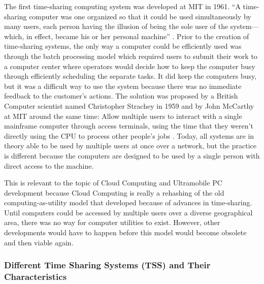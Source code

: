 \documentclass[12pt,oneside,letterpaper]{article}
\begin{document}
The first time-sharing computing system was developed at MIT in 1961.  ``A
time-sharing computer was one organized so that it could be used simultaneously
by many users, each person having the illusion of being the sole user of the
system---which, in effect, became his or her personal machine''
\citep{kelly2004}.  Prior to the creation of time-sharing systems, the only
way a computer could be efficiently used was through the batch processing model
which required users to submit their work to a computer center where operators
would decide how to keep the computer busy through efficiently scheduling the
separate tasks.  It did keep the computers busy, but it was a difficult way to
use the system because there was no immediate feedback to the customer's
actions.  The solution was proposed by a British Computer scientist named
Christopher Strachey in 1959 and by John McCarthy at MIT around the same time:
Allow multiple users to interact with a single mainframe computer through access
terminals, using the time that they weren't directly using the CPU to process
other people's jobs \citep{kelly2004}.  Today, all systems are in theory able
to be used by multiple users at once over a network, but the practice is
different because the computers are designed to be used by a single person with
direct access to the machine.

This is relevant to the topic of Cloud Computing and Ultramobile PC development
because Cloud Computing is really a rehashing of the old computing-as-utility
model that developed because of advances in time-sharing.  Until computers could
be accessed by multiple users over a diverse geographical area, there was no way
for computer utilities to exist.  However, other developments would have to
happen before this model would become obsolete and then viable again.

\subsubsection{Different Time Sharing Systems (TSS) and Their Characteristics}
\end{document}
